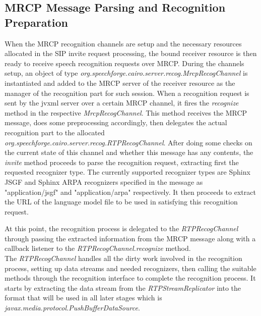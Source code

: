 \subsection{MRCP Message Parsing and Recognition Preparation}
\label{parsemrcp}
When the MRCP recognition channels are setup and the necessary resources allocated in the SIP invite request processing, the bound receiver resource is then ready to receive speech recognition requests over MRCP.
During the channels setup, an object of type \textit{org.speechforge.cairo.server.recog.MrcpRecogChannel} is instantiated and added to the MRCP server of the receiver resource as the manager of the recognition part for such session.
When a recognition request is sent by the \ac{jvxml} server over a certain MRCP channel, it fires the \textit{recognize} method in the respective \textit{MrcpRecogChannel}.
This method receives the MRCP message, does some preprocessing accordingly, then delegates the actual recognition part to the allocated \textit{org.speechforge.cairo.server.recog.RTPRecogChannel}.
After doing some checks on the current state of this channel and whether this message has any contents, the \textit{invite} method proceeds to parse the recognition request, extracting first the requested recognizer type.
The currently supported recognizer types are Sphinx JSGF and Sphinx ARPA recognizers specified in the message as "application/jsgf" and "application/arpa" respectively.
It then proceeds to extract the URL of the language model file to be used in satisfying this recognition request.

At this point, the recognition process is delegated to the \textit{RTPRecogChannel} through passing the extracted information from the MRCP message along with a callback listener to the \textit{RTPRecogChannel.recognize} method.\\
The \textit{RTPRecogChannel} handles all the dirty work involved in the recognition process, setting up data streams and needed recognizers, then calling the suitable methods through the recognition interface to complete the recognition process.
It starts by extracting the data stream from the \textit{RTPStreamReplicator} into the format that will be used in all later stages which is \textit{javax.media.protocol.PushBufferDataSource}.
